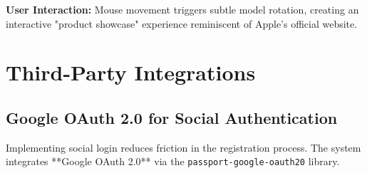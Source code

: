 \documentclass[12pt, a4paper]{report}
\begin{document}
\textbf{User Interaction:} Mouse movement triggers subtle model rotation, creating an interactive "product showcase" experience reminiscent of Apple's official website.

\section{Third-Party Integrations}

\subsection{Google OAuth 2.0 for Social Authentication}

Implementing social login reduces friction in the registration process. The system integrates **Google OAuth 2.0** via the \texttt{passport-google-oauth20} library.
\end{document}
